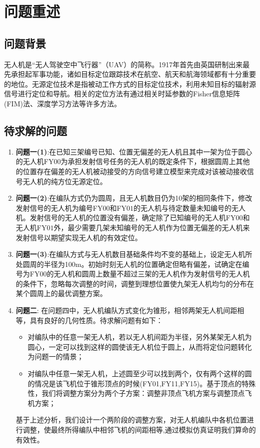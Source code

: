 \documentclass[withoutpreface,bwprint]{cumcmthesis} %
\begin{document}
	
		\section{问题重述}
		\subsection{问题背景}
		\par 无人机是“无人驾驶空中飞行器”（UAV）的简称。1917年首先由英国研制出来最先承担起军事功能，诸如目标定位跟踪技术在航空、航天和航海领域都有十分重要的地位。无源定位技术是指被动工作方式的目标定位技术，利用未知目标的辐射源信号进行定位和导航。相关的定位方法有通过相关时延参数的Fisher信息矩阵(FIM)法\cite{9020301}、深度学习方法\cite{9615429}等许多方法。
		\subsection{待求解的问题}
		\par 
		\begin{enumerate}
			\item{\textbf{问题一(1)}:}在已知三架编号已知、位置无偏差的无人机且其中一架为位于圆心的无人机FY$ 00 $为承担发射信号任务的无人机的既定条件下，根据圆周上其他的位置存在偏差的无人机被动接受的方向信号建立模型来完成对该被动接收信号无人机的纯方位无源定位。
			\item{\textbf{问题一(2)}:}在编队方式仍为圆周，且无人机数目仍为10架的相同条件下，修改发射信号的无人机为编号FY$ 00 $和FY$ 01 $的无人机与待定数量未知编号的无人机。发射信号的无人机的位置没有偏差，确定除了已知编号的无人机FY$ 00 $和无人机FY$ 01 $外，最少需要几架未知编号的无人机作为位置无偏差的无人机来发射信号以期望实现无人机的有效定位。
			\item{\textbf{问题一(3)}:}在编队方式与无人机数目基础条件均不变的基础上，设定无人机所处圆周的半径为100m。初始时刻无人机的位置确定但略有偏差，试确定在编号为FY$ 00 $的无人机和圆周上数量不超过三架的无人机作为发射信号的无人机的条件下，忽略每次调整的时间，调整到理想位置使九架无人机均匀的分布在某个圆周上的最优调整方案。
			\item{\textbf{问题二}:}
			在问题四中，无人机编队方式变化为锥形，相邻两架无人机间距相等，具有良好的几何性质。待求解问题有如下：
			\begin{itemize}
				\item 对编队中的任意一架无人机，若以无人机间距为半径，另外某架无人机为圆心，一定可以找到这样的圆使该无人机位于圆上，从而将定位问题转化为问题一的情景；
				\item 对编队中任意一架无人机，上述圆至少可以找到两个，仅有两个这样的圆的情况是该飞机位于锥形顶点的时候(FY01,FY11,FY15)。基于顶点的特殊性，我们将调整方案分为两个子方案：调整非顶点飞机方案与调整顶点飞机方案；
			\end{itemize}
			基于上述分析，我们设计一个两阶段的调整方案，对无人机编队中各机位置进行调整，使最终所得编队中相邻飞机的间距相等,通过模拟仿真证明我们算命的有效性。
		\end{enumerate}
\end{document}
